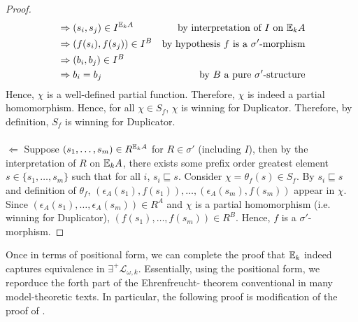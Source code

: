\begin{thm}
\begin{proof}
\begin{align*}
&\Rightarrow (s_{i},s_{j}) \in I^{{\mathbb{E}_{k}A}} & \text{by interpretation of $I$ on ${\mathbb{E}_{k}A}$} \\
&\Rightarrow (f(s_{i}),f(s_{j})) \in I^{B} & \text{by hypothesis $f$ is a $\sigma'$-morphism} \\
&\Rightarrow (b_{i},b_{j}) \in I^{B}\\
&\Rightarrow b_{i} = b_{j} & \text{by $B$ a pure $\sigma'$-structure}
\end{align*}
Hence, $\chi$ is a well-defined partial function.
Therefore, $\chi$ is indeed a partial homomorphism. Hence, for all $\chi \in S_{f}$, $\chi$ is winning for Duplicator. Therefore, by definition, $S_{f}$ is winning for Duplicator.
\\~\\
$\Leftarrow$ Suppose $(s_{1},\dots,s_{m}) \in R^{{\mathbb{E}_{k}A}}$ for $R \in \sigma'$ (including $I$), then by the interpretation of $R$ on ${\mathbb{E}_{k}A}$, there exists some prefix order greatest element $s \in \{s_{1},\dots,s_{m}\}$ such that for all $i$, $s_{i} \sqsubseteq s$. Consider $\chi = \theta_{f}(s) \in S_{f}$. By $s_{i} \sqsubseteq s$ and definition of $\theta_{f}$, $(\epsilon_{A}(s_{1}),f(s_{1})),\dots, (\epsilon_{A}(s_{m}),f(s_{m}))$ appear in $\chi$. Since $(\epsilon_{A}(s_{1}),\dots,\epsilon_{A}(s_{m})) \in R^{A}$ and $\chi$ is a partial homomorphism (i.e. winning for Duplicator), $(f(s_{1}),\dots,f(s_{m})) \in R^{B}$. Hence, $f$ is a $\sigma'$-morphism.
\end{proof}
\label{thm:toPositionalFormEF}
\end{thm}
Once in terms of positional form, we can complete the proof that ${\mathbb{E}_{k}}$ indeed captures equivalence in $\exists^{+}\mathcal{L}_{\omega,k}$. Essentially, using the positional form, we reporduce the forth part of the Ehrenfreucht-{\Fraisse} theorem conventional in many model-theoretic texts. In particular, the following proof is modification of the proof of \cite[Theorem 3.18]{Libkin2004}. 

